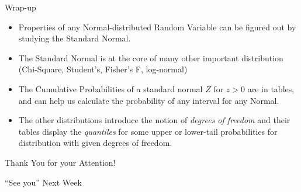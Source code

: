 \documentclass[smaller]{beamer}\usepackage[]{graphicx}\usepackage[]{color}
\begin{document}
\begin{frame}{Wrap-up}

\begin{itemize}
\item Properties of any Normal-distributed Random Variable can be figured out by studying the Standard Normal.\bigskip
\item The Standard Normal is at the core of many other important distribution (Chi-Square, Student's, Fisher's F, log-normal) \bigskip
\item The Cumulative Probabilities of a standard normal $Z$ for $z>0$ are in tables, and can help us calculate the probability of any interval for any Normal.  \bigskip
\item The other distributions introduce the notion of \emph{degrees of freedom} and their tables display the \emph{quantiles} for some upper or lower-tail probabilities for distribution with given degrees of freedom.
\end{itemize}


\end{frame}

\begin{frame}
  \begin{center}
  \Large{Thank You for your Attention!}

  \bigskip
  \pause


  \Large{``See you'' Next Week}
  \end{center}
\end{frame}
\end{document}
